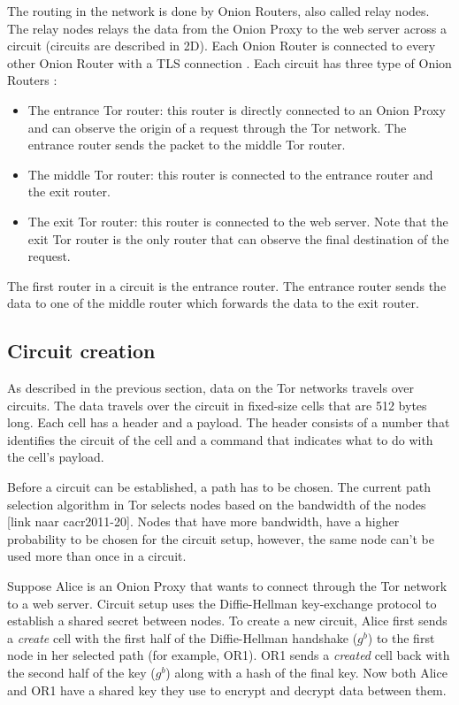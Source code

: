 \documentclass[journal]{IEEEtran}
\begin{document}
		The routing in the network is done by Onion Routers, also called relay nodes. The relay nodes relays the data from the Onion Proxy to the web server across a circuit (circuits are described in 2D). Each Onion Router is connected to every other Onion Router with a TLS connection \cite{tlsprotocol}. Each circuit has three type of Onion Routers \cite{mccoy2008shining}:
		\begin{itemize}
			\item{The entrance Tor router:} this router is directly connected to an Onion Proxy and can observe the origin of a request through the Tor network. The entrance router sends the packet to the middle Tor router.
			\item{The middle Tor router:} this router is connected to the entrance router and the exit router.
			\item{The exit Tor router:} this router is connected to the web server. Note that the exit Tor router is the only router that can observe the final destination of the request.
		\end{itemize}
		
		The first router in a circuit is the entrance router. The entrance router sends the data to one of the middle router which forwards the data to the exit router.
			
	\subsection{Circuit creation}
		\label{ss:tor_circuit}
		As described in the previous section, data on the Tor networks travels over circuits. The data travels over the circuit in fixed-size cells that are 512 bytes long. Each cell has a header and a payload. The header consists of a number that identifies the circuit of the cell and a command that indicates what to do with the cell’s payload.
		
		Before a circuit can be established, a path has to be chosen. The current path selection algorithm in Tor selects nodes based on the bandwidth of the nodes [link naar cacr2011-20]. Nodes that have more bandwidth, have a higher probability to be chosen for the circuit setup, however, the same node can't be used more than once in a circuit.
		
		Suppose Alice is an Onion Proxy that wants to connect through the Tor network to a web server. Circuit setup uses the Diffie-Hellman key-exchange protocol \cite{diffiehellman} to establish a shared secret between nodes. To create a new circuit, Alice first sends a \emph{create} cell with the first half of the Diffie-Hellman handshake ($ g^b $) to the first node in her selected path (for example, OR1). OR1 sends a \emph{created} cell back with the second half of the key ($ g^b $) along with a hash of the final key. Now both Alice and OR1 have a shared key they use to encrypt and decrypt data between them.
		
\end{document}
